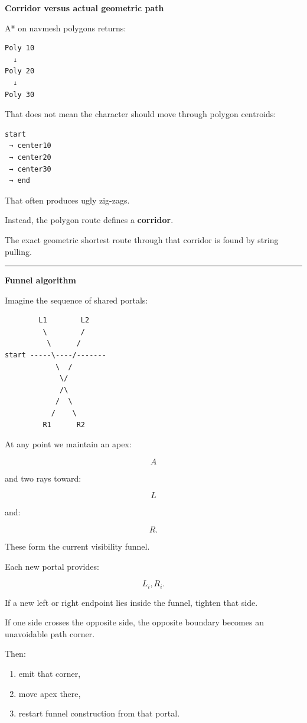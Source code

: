 \textbf{Corridor versus actual geometric path}

A* on navmesh polygons returns:

\begin{verbatim}
Poly 10
  ↓
Poly 20
  ↓
Poly 30
\end{verbatim}

That does not mean the character should move through polygon centroids:

\begin{verbatim}
start
 → center10
 → center20
 → center30
 → end
\end{verbatim}

That often produces ugly zig-zags.

Instead, the polygon route defines a \textbf{corridor}.

The exact geometric shortest route through that corridor is found by string pulling.

\begin{center}\rule{0.5\linewidth}{0.5pt}\end{center}

\textbf{Funnel algorithm}

Imagine the sequence of shared portals:

\begin{verbatim}
        L1        L2
         \        /
          \      /
start -----\----/-------
            \  /
             \/
             /\
            /  \
           /    \
         R1      R2
\end{verbatim}

At any point we maintain an apex:

\[
A
\]

and two rays toward:

\[
L
\]

and:

\[
R.
\]

These form the current visibility funnel.

Each new portal provides:

\[
L_i,R_i.
\]

If a new left or right endpoint lies inside the funnel, tighten that side.

If one side crosses the opposite side, the opposite boundary becomes an unavoidable path corner.

Then:

\begin{enumerate}
\def\labelenumi{\arabic{enumi}.}
\tightlist
\item
  emit that corner,
\item
  move apex there,
\item
  restart funnel construction from that portal.
\end{enumerate}

